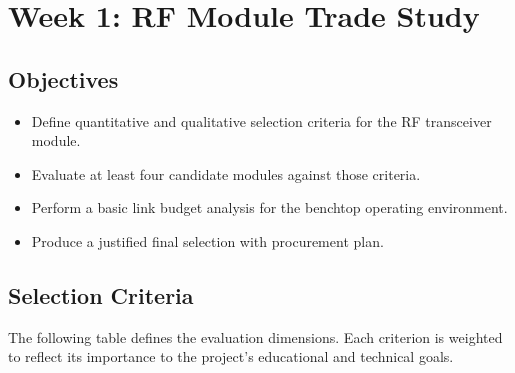 \documentclass[11pt,letterpaper]{article}
\begin{document}
	\newpage
	\section{Week 1: RF Module Trade Study}
	\label{sec:tradestudy}
	
	\subsection{Objectives}
	
	\begin{itemize}[leftmargin=2em]
		\item Define quantitative and qualitative selection criteria for the RF transceiver module.
		\item Evaluate at least four candidate modules against those criteria.
		\item Perform a basic link budget analysis for the benchtop operating environment.
		\item Produce a justified final selection with procurement plan.
	\end{itemize}
	
	\subsection{Selection Criteria}
	
	The following table defines the evaluation dimensions. Each criterion is weighted to reflect its importance to the project's educational and technical goals.
	
\end{document}
